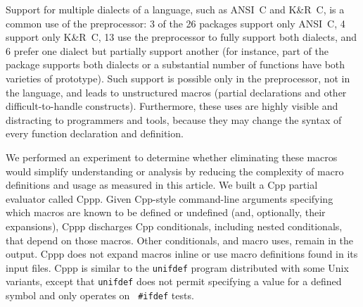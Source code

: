 \documentclass[10pt]{article}
\def\typeofdocument{article}    %
\def\numpackages{26}
\newcommand{\pkg}[1]{\textsf{#1}}
\begin{document}

%

Support for multiple dialects of a language, such as ANSI~C and K\&R~C, is
a common use of the preprocessor:  3 of the {\numpackages} packages support
only ANSI~C, 4 support only K\&R~C, 13 use the preprocessor to fully
support both dialects, and 6 prefer one dialect but partially support
another (for instance, part of the package supports both dialects or a
substantial number of functions have both varieties of prototype).  Such
support is possible only in the preprocessor, not in the language, and
leads to unstructured macros (partial declarations and other
difficult-to-handle constructs).  Furthermore, these uses are highly
visible and distracting to programmers and tools, because they may change
the syntax of every function declaration and definition.



We performed an experiment to determine whether eliminating these macros
would simplify understanding or analysis by reducing the complexity of
macro definitions and usage as measured in this \typeofdocument.  We built
a Cpp partial evaluator called Cppp.  Given Cpp-style command-line
arguments specifying which macros are known to be defined or undefined
(and, optionally, their expansions), Cppp discharges Cpp conditionals,
including nested conditionals, that depend on those macros.  Other
conditionals, and macro uses, remain in the output.  Cppp does not expand
macros inline or use macro definitions found in its input files.  Cppp is
similar to the {\tt unifdef} program distributed with some Unix variants,
except that {\tt unifdef} does not
permit specifying a value for a defined symbol and only operates on {\tt
\#ifdef} tests.
\end{document}
